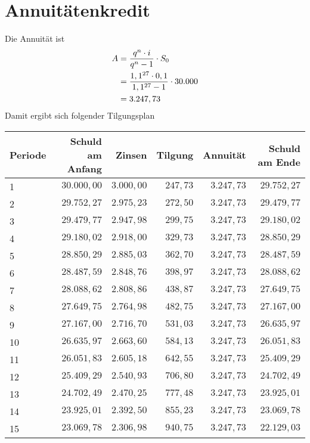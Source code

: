 \documentclass{article}
\begin{document}
	\section*{Annuitätenkredit}
	Die Annuität ist
	\begin{align}
		A &= \frac{q^n\cdot i}{q^n-1}\cdot S_0 \notag \\
		&= \frac{1,1^{27}\cdot 0,1}{1,1^{27}-1}\cdot 30.000 \notag \\
		&= 3.247,73 \notag
	\end{align}
	Damit ergibt sich folgender Tilgungsplan
	\begin{center}
		\begin{tabular}{l|r|r|r|r|r}
			Periode & Schuld am Anfang & Zinsen & Tilgung & Annuität & Schuld am Ende \\
			\hline 1 & $30.000,00 $ & $3.000,00 $ & $247,73 $ & $3.247,73 $ & $29.752,27 $ \\
			\hline 2 & $29.752,27 $ & $2.975,23 $ & $272,50 $ & $3.247,73 $ & $29.479,77 $ \\
			\hline 3 & $29.479,77 $ & $2.947,98 $ & $299,75 $ & $3.247,73 $ & $29.180,02 $ \\
			\hline 4 & $29.180,02 $ & $2.918,00 $ & $329,73 $ & $3.247,73 $ & $28.850,29 $ \\
			\hline 5 & $28.850,29 $ & $2.885,03 $ & $362,70 $ & $3.247,73 $ & $28.487,59 $ \\
			\hline 6 & $28.487,59 $ & $2.848,76 $ & $398,97 $ & $3.247,73 $ & $28.088,62 $ \\
			\hline 7 & $28.088,62 $ & $2.808,86 $ & $438,87 $ & $3.247,73 $ & $27.649,75 $ \\
			\hline 8 & $27.649,75 $ & $2.764,98 $ & $482,75 $ & $3.247,73 $ & $27.167,00 $ \\
			\hline 9 & $27.167,00 $ & $2.716,70 $ & $531,03 $ & $3.247,73 $ & $26.635,97 $ \\
			\hline 10 & $26.635,97 $ & $2.663,60 $ & $584,13 $ & $3.247,73 $ & $26.051,83 $ \\
			\hline 11 & $26.051,83 $ & $2.605,18 $ & $642,55 $ & $3.247,73 $ & $25.409,29 $ \\
			\hline 12 & $25.409,29 $ & $2.540,93 $ & $706,80 $ & $3.247,73 $ & $24.702,49 $ \\
			\hline 13 & $24.702,49 $ & $2.470,25 $ & $777,48 $ & $3.247,73 $ & $23.925,01 $ \\
			\hline 14 & $23.925,01 $ & $2.392,50 $ & $855,23 $ & $3.247,73 $ & $23.069,78 $ \\
			\hline 15 & $23.069,78 $ & $2.306,98 $ & $940,75 $ & $3.247,73 $ & $22.129,03 $ \\

\end{tabular}
\end{center}
\end{document}
